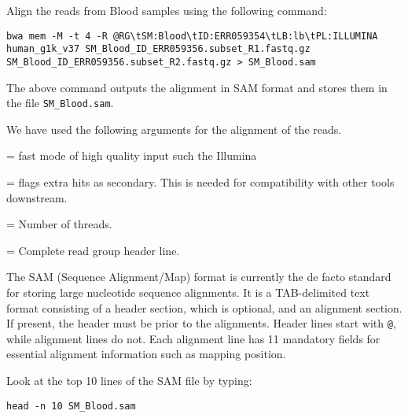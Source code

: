 \begin{steps}
Align the reads from Blood samples using the following command: 

\begin{lstlisting}
bwa mem -M -t 4 -R @RG\tSM:Blood\tID:ERR059354\tLB:lb\tPL:ILLUMINA human_g1k_v37 SM_Blood_ID_ERR059356.subset_R1.fastq.gz SM_Blood_ID_ERR059356.subset_R2.fastq.gz > SM_Blood.sam
\end{lstlisting}

The above command outputs the alignment in SAM format and stores them in the
file \texttt{SM\_Blood.sam}.
\end{steps}

\begin{note}
We have used the following arguments for the alignment of the reads.
\begin{description}[style=multiline,labelindent=0cm,align=right,leftmargin=\descriptionlabelspace,rightmargin=1.5cm,font=\ttfamily]
  \item[mem] = fast mode of high quality input such the Illumina
  \item[-M] = flags extra hits as secondary. This is needed for compatibility with other tools downstream.
  \item[-t] = Number of threads.
  \item[-R] = Complete read group header line.
\end{description}

\end{note}

\begin{information}
The SAM (Sequence Alignment/Map) format is currently the de facto standard for storing large nucleotide sequence alignments. It is a TAB-delimited text format consisting of a header section, which is optional, and an alignment section. If present, the header must be prior to the alignments. Header lines start with \texttt{@}, while alignment lines do not. Each alignment line has 11 mandatory fields for essential alignment information such as mapping position.
\end{information}


\begin{steps}
Look at the top 10 lines of the SAM file by typing:

\begin{lstlisting}
head -n 10 SM_Blood.sam
\end{lstlisting}
\end{steps}

